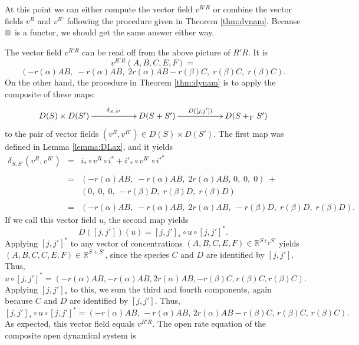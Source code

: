 \documentclass{compositionalityarticle}
\newcommand{\R}{\mathbb{R}}
\newcommand*{\graysquare}{\textcolor{lightgray}{\blacksquare}}
\theoremstyle{plain}
\theoremstyle{remark}
\begin{document}
At this point we can either compute the vector field $v^{R'R}$ or combine the vector fields $v^R$ and $v^{R'}$ following the procedure given in Theorem \ref{thm:dynam}.  Because $\graysquare$ is a functor, we should get the same answer either way.

The vector field $v^{R'R}$ can be read off from the above picture of $R'R$.  It is
\begin{equation}
\label{eq:v_3}
     v^{R'R}(A,B,C,E,F) = 
\end{equation}
\[
(-r(\alpha) A B, \; -r(\alpha) A B, \; 2 r(\alpha) AB - r(\beta) C, \; r(\beta) C, \; r(\beta) C ) .
\]
On the other hand, the procedure in Theorem \ref{thm:dynam} is to apply the composite of these maps:
\[      
\xymatrix{      D(S) \times D(S') \ar[rr]^-{\delta_{S,S'}} && 
                     D(S + S') \ar[rr]^-{D([j,j'])} && D(S +_Y S') } \]
to the pair of vector fields $(v^R,v^{R'}) \in D(S) \times D(S')$.    The first map
was defined in Lemma \ref{lemma:DLax}, and it yields
\[   \begin{array}{ccl}
  \delta_{S,S'}(v^R,v^{R'}) &=& i_* \circ v^R \circ i^* + i'_* \circ v^{R'} \circ {i'}^* \\  \\
&=&  ( -r(\alpha) AB, \; -r(\alpha) AB , \; 2r(\alpha) AB, \, 0, \; 0, \; 0) \; + \\ 
&& (0, \; 0,\; 0,\, -r(\beta) D , \;r(\beta) D , \; r(\beta) D) \\ \\
&=& ( -r(\alpha) AB,\; -r(\alpha) AB ,\; 2r(\alpha) AB, \; -r(\beta) D , \; r(\beta) D ,\; r(\beta) D).
\end{array}
\]
If we call this vector field $u$, the second map yields
\[  D([j,j'])(u) = [j,j']_* \circ u \circ [j,j']^*.\]
Applying $[j,j']^*$ to any vector of concentrations $(A,B,C,E,F) \in \R^{S +_Y S'}$ yields
$(A,B,C,C,E,F) \in \R^{S+S'}$, since the species $C$ and $D$ are identified by $[j,j']$.   Thus, 
\[   u \circ [j,j']^* =  ( -r(\alpha) AB, -r(\alpha) AB , 2r(\alpha) AB, -r(\beta) C , r(\beta) C , r(\beta) C). \]
Applying $[j,j']_*$ to this, we sum the third and fourth components, again because $C$
and $D$ are identified by $[j,j']$.  Thus,
\[   [j,j']_* \circ u \circ [j,j']^* =  ( -r(\alpha) AB, \, -r(\alpha) AB , \, 2r(\alpha) AB -r(\beta) C , \, r(\beta) C , \, r(\beta) C). \]
As expected, this vector field equals $v^{R'R}$.     The open rate equation of the composite open dynamical system is
\end{document}
